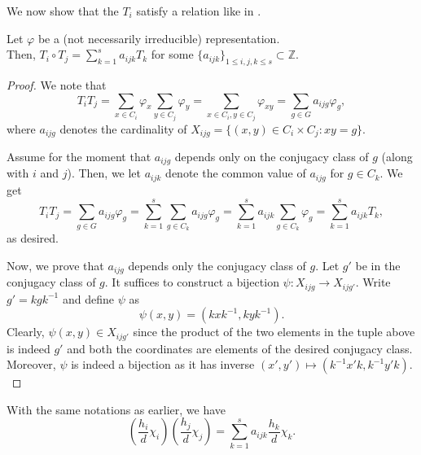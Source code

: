 We now show that the $T_i$ satisfy a relation like in .

\begin{lem} 
	Let $\varphi$ be a (not necessarily irreducible) representation. \\
	Then, $T_i \circ T_j = \displaystyle\sum_{k = 1}^{s}a_{ijk}T_k$ for some $\{a_{ijk}\}_{1 \le i, j, k \le s} \subset \mathbb{Z}.$
\end{lem}
\begin{proof} 
	We note that
	\begin{equation*} 
		T_iT_j = \sum_{x \in C_i}\varphi_x\sum_{y \in C_j} \varphi_y = \sum_{x \in C_i, y \in C_j}\varphi_{xy} = \sum_{g \in G}a_{ijg}\varphi_g,
	\end{equation*}
	where $a_{ijg}$ denotes the cardinality of $X_{ijg} = \{(x, y) \in C_i \times C_j : xy = g\}.$

	Assume for the moment that $a_{ijg}$ depends only on the conjugacy class of $g$ (along with $i$ and $j$). Then, we let $a_{ijk}$ denote the common value of $a_{ijg}$ for $g \in C_k.$ We get
	\begin{equation*} 
		T_iT_j = \sum_{g \in G}a_{ijg}\varphi_g = \sum_{k = 1}^{s}\sum_{g \in C_k} a_{ijg}\varphi_g = \sum_{k = 1}^{s}a_{ijk} \sum_{g \in C_k}\varphi_g = \sum_{k = 1}^{s}a_{ijk}T_k,
	\end{equation*}
	as desired.

	Now, we prove that $a_{ijg}$ depends only the conjugacy class of $g.$ Let $g'$ be in the conjugacy class of $g.$ It suffices to construct a bijection $\psi : X_{ijg} \to X_{ijg'}.$ Write $g' = kgk^{-1}$ and define $\psi$ as
	\begin{equation*} 
		\psi(x, y) = (kxk^{-1}, kyk^{-1}).
	\end{equation*}
	Clearly, $\psi(x, y) \in X_{ijg'}$ since the product of the two elements in the tuple above is indeed $g'$ and both the coordinates are elements of the desired conjugacy class. Moreover, $\psi$ is indeed a bijection as it has inverse $(x' , y') \mapsto (k^{-1}x'k, k^{-1}y'k).$
\end{proof}

\begin{cor}
	With the same notations as earlier, we have
	\begin{equation*} 
		\left(\frac{h_i}{d}\chi_i\right)\left(\frac{h_j}{d}\chi_j\right) = \sum_{k = 1}^{s}a_{ijk}\frac{h_k}{d}\chi_k.
	\end{equation*}
\end{cor}

